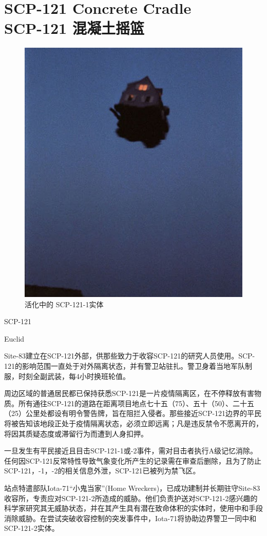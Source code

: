 \chapter[SCP-121 混凝土摇篮]{
    SCP-121 Concrete Cradle\\
    SCP-121 混凝土摇篮
}

\label{chap:SCP-121}

\begin{figure}[H]
    \centering
    \includegraphics[width=0.5\linewidth]{images/SCP.121.png}
    \caption*{活化中的 SCP-121-1实体}
\end{figure}

SCP-121

Euclid

Site-83建立在SCP-121外部，供那些致力于收容SCP-121的研究人员使用。SCP-121的影响范围一直处于对外隔离状态，并有警卫站驻扎。警卫身着当地军队制服，时刻全副武装，每4小时换班轮值。

周边区域的普通居民都已保持获悉SCP-121是一片疫情隔离区，在不停释放有害物质。所有通往SCP-121的道路在距离项目地点七十五（75）、五十（50）、二十五（25）公里处都设有明令警告牌，旨在阻拦入侵者。那些接近SCP-121边界的平民将被告知该地段正处于疫情隔离状态，必须立即远离；凡是违反禁令不愿离开的，将因其质疑态度或滞留行为而遭到人身扣押。

一旦发生有平民接近且目击SCP-121-1或-2事件，需对目击者执行A级记忆消除。任何因SCP-121反常特性导致气象变化所产生的记录需在审查后删除，且为了防止SCP-121，-1，-2的相关信息外泄，SCP-121已被列为禁飞区。

站点特遣部队Iota-71“小鬼当家”(Home Wreckers)，已成功建制并长期驻守Site-83收容所，专责应对SCP-121-2所造成的威胁。他们负责护送对SCP-121-2感兴趣的科学家研究其无威胁状态，并在其产生具有潜在致命体积的实体时，使用中和手段消除威胁。在尝试突破收容控制的突发事件中，Iota-71将协助边界警卫一同中和SCP-121-2实体。

